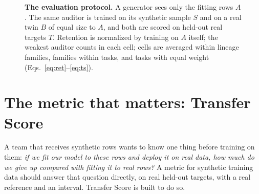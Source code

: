 \documentclass[10pt,letterpaper,twocolumn]{article}
\newcommand{\ct}[1]{{\bfseries\color{ink}#1}}   %
\newcommand{\fsfont}{\sffamily\fontsize{6.6}{8.1}\selectfont}
\newcommand{\fl}[1]{{\sffamily\bfseries\fontsize{7.5}{9}\selectfont\color{ink}#1}}       %
\newcommand{\fs}[1]{{\sffamily\fontsize{6.6}{8.1}\selectfont\color{sub}#1}}              %
\newcommand{\fpanel}[1]{{\sffamily\bfseries\fontsize{8.6}{10}\selectfont\color{ink}#1}} %
\begin{document}
\begin{figure}[t]
\caption{\ct{The evaluation protocol.} A generator sees only the fitting rows $A$. The same auditor is trained on its synthetic sample $S$ and on a real twin $B$ of equal size to $A$, and both are scored on held-out real targets $T$. Retention is normalized by training on $A$ itself; the weakest auditor counts in each cell; cells are averaged within lineage families, families within tasks, and tasks with equal weight (Eqs.~\ref{eq:ret}--\ref{eq:ts}).}
\label{fig:protocol}
\end{figure}
\section{The metric that matters: Transfer Score}\label{sec:metric}
A team that receives synthetic rows wants to know one thing before training on them: \emph{if we fit our model to these rows and deploy it on real data, how much do we give up compared with fitting it to real rows?} A metric for synthetic training data should answer that question directly, on real held-out targets, with a real reference and an interval. Transfer Score is built to do so.
\end{document}
